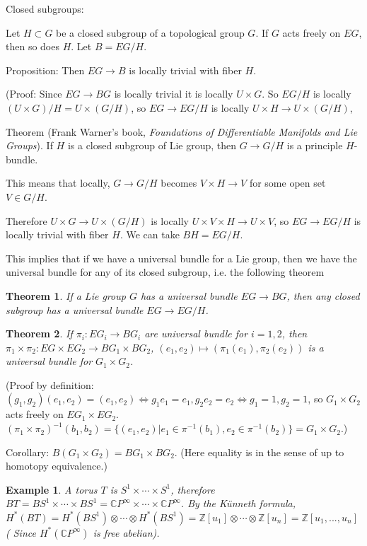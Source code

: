 \documentclass{article}
\theoremstyle{mystyle}
\newtheorem*{theorem*}{Theorem}
\newtheorem*{example}{Example}
\theoremstyle{remark}
\numberwithin{equation}{section}
\begin{document}
Closed subgroups:

Let $H\subset G$ be a closed subgroup of a topological group $G$. If $G$ acts freely on $EG$, then so does $H$. Let $B = EG/H$. 

Proposition: Then $EG\rightarrow B$ is locally trivial with fiber $H$. 

(Proof: Since $EG\rightarrow BG$ is locally trivial it is locally $U\times G$. So $EG/H$ is locally $(U\times G)/H = U\times (G/H)$, so $EG\rightarrow EG/H$ is locally $U\times H\rightarrow U\times (G/H)$, 

Theorem (Frank Warner's book, \emph{Foundations of Differentiable Manifolds and Lie Groups}). If $H$ is a closed subgroup of Lie group, then $G\rightarrow G/H$ is a principle $H$-bundle. 

This means that locally, $G\rightarrow G/H$ becomes $V\times H\rightarrow V$ for some open set $V \in G/H$.

Therefore $U\times G\rightarrow U\times (G/H)$ is locally $U\times V\times H \rightarrow U\times V$, so $EG\rightarrow EG/H$ is locally trivial with fiber $H$. We can take $BH = EG/H$.

This implies that if we have a universal bundle for a Lie group, then we have the universal bundle for any of its closed subgroup, i.e. the following theorem


\begin{theorem*} If a Lie group $G$ has a universal bundle $EG\rightarrow BG$, then any closed subgroup has a universal bundle $EG\rightarrow EG/H$.
\end{theorem*}

\begin{theorem*} If $\pi_i\colon EG_i\rightarrow BG_i$ are universal bundle for $i=1,2$, then $\pi_1\times \pi_2 \colon EG\times EG_2 \rightarrow BG_1\times BG_2$, $(e_1,e_2)\mapsto (\pi_1(e_1),\pi_2(e_2))$ is a universal bundle for $G_1\times G_2$.
\end{theorem*}

(Proof by definition: $(g_1,g_2)(e_1,e_2) = (e_1,e_2)\Leftrightarrow g_1e_1=e_1, g_2e_2=e_2\Leftrightarrow g_1=1, g_2=1$, so $G_1\times G_2$ acts freely on $EG_1\times EG_2$. $(\pi_1\times \pi_2)^{-1}(b_1,b_2) = \{(e_1,e_2)|e_1 \in \pi^{-1}(b_1),e_2 \in \pi^{-1}(b_2)\} = G_1\times G_2$.)

Corollary: $B(G_1\times G_2) = BG_1\times BG_2$.  (Here equality is in the sense of up to homotopy equivalence.)


\begin{example} A torus $T$ is $S^1\times \cdots \times S^1$, therefore $BT = BS^1\times \cdots \times BS^1 = \mathbb{C}P^\infty\times \cdots \times \mathbb{C}P^\infty$. By the Künneth formula, $H^*(BT) = H^*(BS^1)\otimes \cdots \otimes H^*(BS^1) = \mathbb{Z}[u_1]\otimes \cdots \otimes \mathbb{Z}[u_n] = \mathbb{Z}[u_1,...,u_n]$ ( Since $H^*(\mathbb{C}P^\infty)$ is free abelian).
\end{example}
\end{document}
